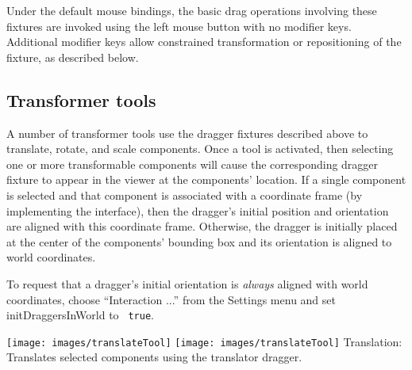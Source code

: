 \documentclass{article}
\begin{document}
\begin{sideblock}
Under the default mouse bindings, the basic drag operations involving
these fixtures are invoked using the left mouse button with no
modifier keys. Additional modifier keys allow constrained transformation
or repositioning of the fixture, as described below.
\end{sideblock}

\subsection{Transformer tools}
\label{TransformerToolsSec}

A number of transformer tools use the dragger fixtures described
above to translate, rotate, and scale components. Once a tool is
activated, then selecting one or more transformable components will
cause the corresponding dragger fixture to appear in the viewer at the
components' location. If a single component is selected and 
that component is 
associated with a coordinate frame (by implementing the
 interface), 
then the dragger's initial position
and orientation are aligned with this coordinate frame.
Otherwise, the dragger is initially placed at the center of the
components' bounding box and its orientation is aligned to world
coordinates.

To request that a dragger's initial orientation is {\it always}
aligned with world coordinates, choose {\sf ``Interaction ...''}  from
the {\sf Settings} menu and set {\sf initDraggersInWorld} to {\tt
true}.

%

\vspace{\parskip}
\iflatexml
\phantom{.}\texttt{[image: images/translateTool]}
\else
\texttt{[image: images/translateTool]}
\fi
{\sf Translation:}\\
Translates selected components using the translator dragger.
\end{document}
